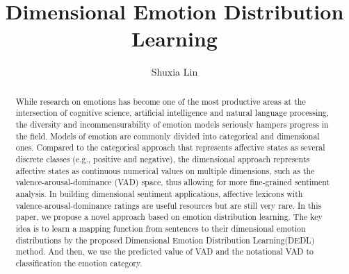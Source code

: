 \documentclass{amsart}
\begin{document}
%
%
\title[Lin's Scientific Research II]{Dimensional Emotion Distribution Learning }%

\author{Shuxia Lin}
\address[A.~1]{School of Computer Science,\\ 
SouthEast University, NanJing 211189, China}%


%
%
\date{\gitAuthorDate}%

\begin{abstract}

While research on emotions has become 
one of the most productive areas at 
the intersection of cognitive science, 
artificial intelligence and natural language processing,
the diversity and incommensurability of 
emotion models seriously hampers progress in the field.
Models of emotion are commonly divided into
categorical and dimensional ones.
Compared to the categorical approach
that represents affective states as 
several discrete classes (e.g., positive and negative),
the dimensional approach represents
affective states as continuous numerical values 
on multiple dimensions,
such as the valence-arousal-dominance (VAD) space,
thus allowing for 
more fine-grained sentiment analysis. 
In building dimensional sentiment applications, 
affective lexicons
with valence-arousal-dominance ratings are 
useful resources but 
are still very rare.
In this paper, 
we propose a novel approach
based on emotion distribution learning.
The key idea is to learn a mapping function
from sentences to their dimensional emotion distributions
by the proposed 
Dimensional Emotion Distribution Learning(DEDL)
method.
And then,
we use the predicted value of VAD and 
the notational VAD to 
classification the emotion category.

\end{abstract}

\maketitle
\tableofcontents

\newpage



\newpage




\end{document}
